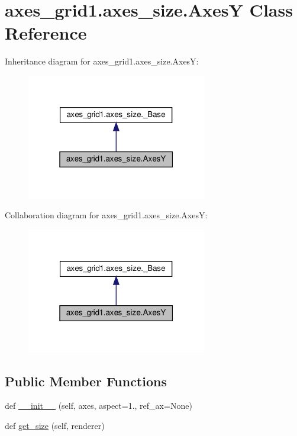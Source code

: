 \hypertarget{classaxes__grid1_1_1axes__size_1_1AxesY}{}\section{axes\+\_\+grid1.\+axes\+\_\+size.\+AxesY Class Reference}
\label{classaxes__grid1_1_1axes__size_1_1AxesY}


Inheritance diagram for axes\+\_\+grid1.\+axes\+\_\+size.\+AxesY\+:
\nopagebreak
\begin{figure}[H]
\begin{center}
\leavevmode
\includegraphics[width=223pt]{classaxes__grid1_1_1axes__size_1_1AxesY__inherit__graph}
\end{center}
\end{figure}


Collaboration diagram for axes\+\_\+grid1.\+axes\+\_\+size.\+AxesY\+:
\nopagebreak
\begin{figure}[H]
\begin{center}
\leavevmode
\includegraphics[width=223pt]{classaxes__grid1_1_1axes__size_1_1AxesY__coll__graph}
\end{center}
\end{figure}
\subsection*{Public Member Functions}
\begin{DoxyCompactItemize}
\item 
def \hyperlink{classaxes__grid1_1_1axes__size_1_1AxesY_a35fa2e13e7e52ba87c644b31db1c2a48}{\+\_\+\+\_\+init\+\_\+\+\_\+} (self, axes, aspect=1., ref\+\_\+ax=None)
\item 
def \hyperlink{classaxes__grid1_1_1axes__size_1_1AxesY_a904d1dc970ecd0b7e7fe6b86e9be619f}{get\+\_\+size} (self, renderer)
\end{DoxyCompactItemize}



